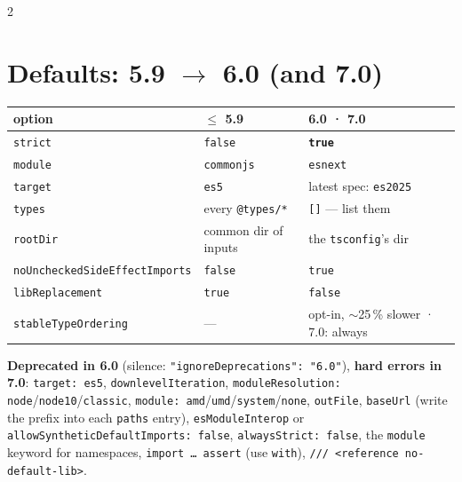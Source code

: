 \documentclass[8pt]{extarticle}
\newcommand\ct[1]{\texttt{#1}}
\begin{document}
\begin{multicols}{2}
\raggedright
\footnotesize{}

\section{Defaults: 5.9 $\to$ 6.0 (and 7.0)}
{\scriptsize\setlength{\tabcolsep}{2pt}
\begin{tabular}{@{}>{\raggedright\arraybackslash}p{29mm}>{\raggedright\arraybackslash}p{22mm}>{\raggedright\arraybackslash}p{26mm}@{}}
\toprule
\textbf{option} & \textbf{$\leq$ 5.9} & \textbf{6.0 · 7.0}\\
\midrule
\ct{strict} & \ct{false} & \textbf{\ct{true}}\\
\ct{module} & \ct{commonjs} & \ct{esnext}\\
\ct{target} & \ct{es5} & latest spec: \ct{es2025}\\
\ct{types} & every \ct{@types/*} & \ct{[]} — list them\\
\ct{rootDir} & common dir of inputs & the \ct{tsconfig}'s dir\\
\ct{noUncheckedSideEffectImports} & \ct{false} & \ct{true}\\
\ct{libReplacement} & \ct{true} & \ct{false}\\
\ct{stableTypeOrdering} & — & opt-in, $\sim$25\,\% slower · 7.0: always\\
\bottomrule
\end{tabular}}\par
\textbf{Deprecated in 6.0} (silence: \ct{"ignoreDeprecations": "6.0"}), \textbf{hard errors in
7.0}: \ct{target: es5}, \ct{downlevelIteration}, \ct{moduleResolution: node}/\ct{node10}/\ct{classic},
\ct{module: amd}/\ct{umd}/\ct{system}/\ct{none}, \ct{outFile}, \ct{baseUrl} (write the prefix into
each \ct{paths} entry), \ct{esModuleInterop} or \ct{allowSyntheticDefaultImports: false},
\ct{alwaysStrict: false}, the \ct{module} keyword for namespaces, \ct{import … assert} (use
\ct{with}), \ct{/// <reference no-default-lib>}.


\end{multicols}
\end{document}
